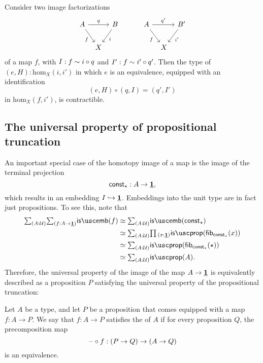 \begin{cor}
  Consider two image factorizations
  \begin{equation*}
    \begin{tikzcd}[column sep=tiny]
      A \arrow[dr,swap,"f"] \arrow[rr,"q"] & & B \arrow[dl,"i"] &[2em] A \arrow[dr,swap,"f"] \arrow[rr,"{q'}"] & & B' \arrow[dl,"{i'}"] \\
      & X & & \phantom{B'} & X
    \end{tikzcd}
  \end{equation*}
  of a map $f$, with $I:f\sim i\circ q$ and $I':f\sim i'\circ q'$. Then the type of $(e,H):\mathrm{hom}_X(i,i')$ in which $e$ is an equivalence, equipped with an identification
  \begin{equation*}
    (e,H)\circ(q,I)=(q',I')
  \end{equation*}
  in $\mathrm{hom}_X(f,i')$, is contractible.
\end{cor}

\subsection{The universal property of propositional truncation}

An important special case of the homotopy image of a map is the image of the terminal projection
\begin{equation*}
  \mathsf{const}_\star : A \to \underline{\mathbf{1}},
\end{equation*}
which results in an embedding $I\hookrightarrow \underline{\mathbf{1}}$. Embeddings into the unit type are in fact just propositions. To see this, note that
\begin{align*}
\sm{A:\UU}{f:A\to\unit}\isemb(f)
& \eqvsym \sm{A:\UU}\isemb(\const_\ttt) \\
& \eqvsym \sm{A:\UU}\prd{x:\unit}\isprop(\fib{\const_\ttt}{x}) \\
& \eqvsym \sm{A:\UU}\isprop(\fib{\const_\ttt}{\ttt}) \\
& \eqvsym \sm{A:\UU}\isprop(A).
\end{align*}
Therefore, the universal property of the image of the map $A\to\underline{\mathbf{1}}$ is equivalently described as a proposition $P$ satisfying the universal property of the propositional truncation:

\begin{defn}
Let $A$ be a type, and let $P$ be a proposition that comes equipped with a map $f:A\to P$. We say that $f:A\to P$ satisfies the  of $A$ if for every proposition $Q$, the precomposition map
\begin{equation*}
\mathord{\hspace{1pt}\text{--}\hspace{1pt}}\circ f:(P\to Q)\to (A\to Q)
\end{equation*}
is an equivalence.
\end{defn}

